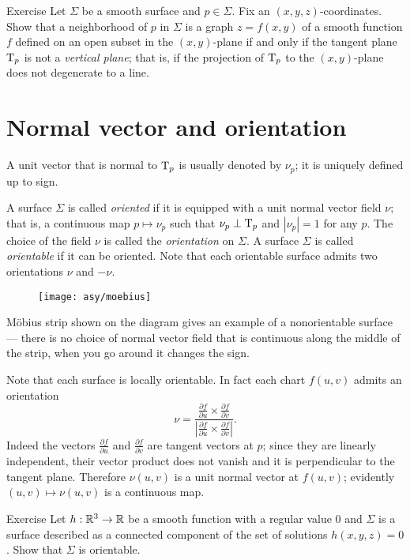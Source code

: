 \begin{thm}{Exercise}\label{ex:vertical-tangent}
Let $\Sigma$ be a smooth surface and $p\in\Sigma$.
Fix an $(x,y,z)$-coordinates.
Show that a neighborhood of $p$ in $\Sigma$ is a graph $z=f(x,y)$ of a smooth function $f$ defined on an open subset in the $(x,y)$-plane if and only if the tangent plane $\mathrm{T}_p$ is not a \emph{vertical plane}; that is, if the projection of $\mathrm{T}_p$ to the $(x,y)$-plane does not degenerate to a line.
\end{thm}



\section*{Normal vector and orientation}
A unit vector that is normal to $\mathrm{T}_p$ is usually denoted by $\nu_p$;
it is uniquely defined up to sign.

A surface $\Sigma$ is called \emph{oriented} if it is equipped with a unit normal vector field $\nu$;
that is, a continuous map $p\mapsto \nu_p$ such that $\nu_p\perp\mathrm{T}_p$ and $|\nu_p|=1$ for any $p$.
The choice of the field $\nu$ is called the \emph{orientation} on $\Sigma$.
A surface $\Sigma$ is called \emph{orientable} if it can be oriented.
Note that each orientable surface admits two orientations $\nu$ and $-\nu$. %

\begin{wrapfigure}{r}{40 mm}
\vskip-0mm
\centering
\texttt{[image: asy/moebius]}
\vskip0mm
\end{wrapfigure}

M\"obius strip shown on the diagram gives an example of a nonorientable surface --- there is no choice of normal vector field that is continuous along the middle of the strip, 
when you go around it changes the sign.

Note that each surface is locally orientable.
In fact each chart $f(u,v)$ admits an orientation 
\[\nu=
\frac{\tfrac{\partial f}{\partial u}\times \tfrac{\partial f}{\partial v}}
{\left|\tfrac{\partial f}{\partial u}\times \tfrac{\partial f}{\partial v}\right|}.\]
Indeed the vectors $\tfrac{\partial f}{\partial u}$ and $\tfrac{\partial f}{\partial v}$ are tangent vectors at $p$; 
since they are linearly independent, their vector product does not vanish and it is perpendicular to the tangent plane.
Therefore $\nu(u,v)$ is a unit normal vector at $f(u,v)$;
evidently $(u,v)\mapsto \nu(u,v)$ is a continuous map. 

\begin{thm}{Exercise}
Let $h:\mathbb{R}^3\to\mathbb{R}$ be a smooth function with a regular value $0$ and $\Sigma$ is a surface described as a connected component of the set of solutions $h(x,y,z)=0$.
Show that $\Sigma$ is orientable.
\end{thm}

